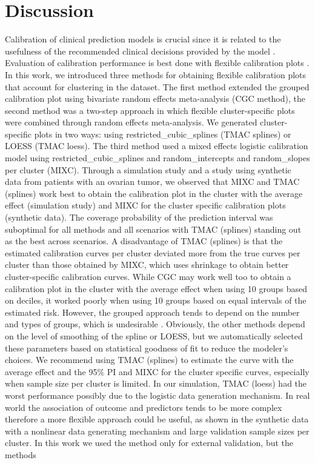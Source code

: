 \section{Discussion}
Calibration of clinical prediction models is crucial since it is related to the usefulness of the recommended clinical decisions provided by the model \cite{vancalsterCalibrationRiskPrediction2015}. Evaluation of calibration performance is best done with flexible calibration plots \cite{vancalsterCalibrationHierarchyRisk2016,austinGraphicalAssessmentInternal2014}. In this work, we introduced three methods for obtaining flexible calibration plots that account for clustering in the dataset. The first method extended the grouped calibration plot using bivariate random effects meta-analysis (\gls{CGC} method), the second method was a two-step approach in which flexible cluster-specific plots were combined through random effects meta-analysis. We generated cluster-specific plots in two ways: using \gls{restricted_cubic_splines} (\gls{TMAC} splines) or LOESS (\gls{TMAC} loess). The third method used a mixed effects logistic calibration model using \gls{restricted_cubic_splines} and \glspl{random_intercept} and \glspl{random_slope} per cluster (\gls{MIXC}). Through a simulation study and a study using synthetic data from patients with an ovarian tumor, we observed that \gls{MIXC} and \gls{TMAC} (splines) work best to obtain the calibration plot in the cluster with the average effect (simulation study) and \gls{MIXC} for the cluster specific calibration plots (synthetic data). The coverage probability of the prediction interval was suboptimal for all methods and all scenarios with \gls{TMAC} (splines) standing out as the best across scenarios. A disadvantage of \gls{TMAC} (splines) is that the estimated calibration curves per cluster deviated more from the true curves per cluster than those obtained by \gls{MIXC}, which uses shrinkage to obtain better cluster-specific calibration curves. While \gls{CGC} may work well too to obtain a calibration plot in the cluster with the average effect when using 10 groups based on deciles, it worked poorly when using 10 groups based on equal intervals of the estimated risk. However, the grouped approach tends to depend on the number and types of groups, which is undesirable \cite{vancalsterPerformanceEvaluationPredictive2024,arrieta-ibarraMetricsCalibrationProbabilistic2022}. Obviously, the other methods depend on the level of smoothing of the spline or LOESS, but we automatically selected these parameters based on statistical goodness of fit to reduce the modeler's choices. We recommend using \gls{TMAC} (splines) to estimate the curve with the average effect and the 95\% \gls{PI} and \gls{MIXC} for the cluster specific curves, especially when sample size per cluster is limited. In our simulation, \gls{TMAC} (loess) had the worst performance possibly due to the logistic data generation mechanism. In real world the association of outcome and predictors tends to be more complex therefore a more flexible approach could be useful, as shown in the synthetic data with a nonlinear data generating mechanism and large validation sample sizes per cluster. In this work we used the method only for external validation, but the methods 